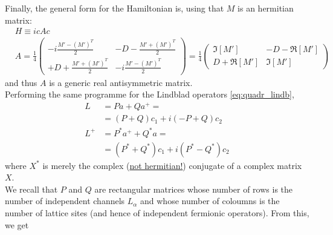 \documentclass[a4paper,11pt]{article}
\theoremstyle{remark}
\newcommand{\ubar}[1]{\underline{#1}}
\begin{document}
    Finally, the general form for the Hamiltonian is, using that $M$ is an hermitian matrix:
    \begin{subequations}
    \label{eq:quadr_ham_majorana}
    \begin{align}
     & H \equiv icAc\\
     & A = \frac{1}{4}\left(
     \begin{array}{cc}
       -i\frac{M'-(M')^T}{2} & -D - \frac{M'+(M')^T}{2} \\
       + D + \frac{M'+(M')^T}{2} & -i \frac{M'-(M')^T}{2}
        \end{array}
        \right)
      =\frac{1}{4}\left( 
      \begin{array}{cc}
        \Im[M'] & -D-\Re[M']\\
        D+\Re[M'] & \Im[M']
        \end{array}
        \right)
    \end{align}
    \end{subequations}
    and thus $A$ is a generic real antisymmetric matrix.\\[0.3cm] Performing the same programme for the Lindblad operators \ref{eq:quadr_lindb},
    \begin{align*}
   L &= P a + Q a^+=\\
     &= (P+Q)c_1 +i(-P+Q)c_2\\
   L^+&= P^*a^++Q^*a=\\
     &= (P^*+Q^*)c_1+i(P^*-Q^*)c_2  
    \end{align*}  
   where $X^*$ is merely the complex (\ubar{not hermitian!}) conjugate of a complex matrix $X$. \\We recall that $P$ and $Q$ are rectangular matrices whose number of rows is the number of independent channels $L_{\alpha}$ and whose number of coloumns is the number of lattice sites (and hence of independent fermionic operators). From this, we get
\end{document}
